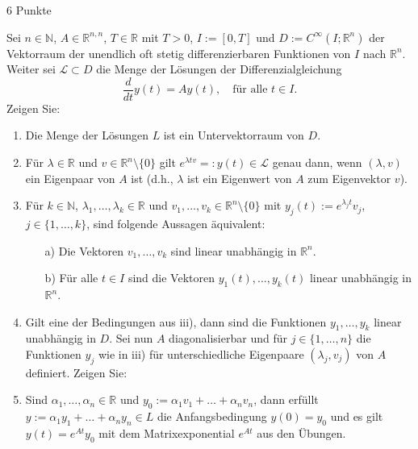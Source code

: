 \documentclass{problemset}
\begin{document}
\begin{problem}[Aufgabe 2]{6 Punkte}

Sei $n \in \mathbb{N}$, $A \in \mathbb{R}^{n,n}$, $T \in \mathbb{R}$ mit $T >
    0$, $I := [0, T]$ und $D := C^\infty(I; \mathbb{R}^n)$ der Vektorraum der
unendlich oft stetig differenzierbaren Funktionen von $I$ nach $\mathbb{R}^n$.
Weiter sei $\mathcal{L} \subset D$ die Menge der Lösungen der
Differenzialgleichung
\[ \frac{d}{dt} y(t) = Ay(t), \quad \text{für alle } t \in I. \]
Zeigen Sie:
\begin{enumerate}
    \item Die Menge der Lösungen $L$ ist ein Untervektorraum von $D$.
    \item Für $\lambda \in \mathbb{R}$ und $v \in \mathbb{R}^n \setminus \{0\}$
          gilt $e^{\lambda t v} =: y(t) \in \mathcal{L}$ genau dann, wenn
          $(\lambda, v)$ ein Eigenpaar von $A$ ist (d.h., $\lambda$ ist ein
          Eigenwert von $A$ zum Eigenvektor $v$).
    \item \label{prob:2:iii} Für $k \in \mathbb{N}$, $\lambda_1, \dots, \lambda_k \in \mathbb{R}$
          und $v_1, \dots, v_k \in \mathbb{R}^n \setminus \{0\}$ mit $y_j(t) :=
              e^{\lambda_j t} v_j$, $j \in \{1, \dots, k\}$, sind folgende Aussagen
          äquivalent:
          \begin{itemize}
              \item[a)] Die Vektoren $v_1, \dots, v_k$ sind linear unabhängig
                    in $\mathbb{R}^n$.
              \item[b)] Für alle $t \in I$ sind die Vektoren $y_1(t), \dots,
                        y_k(t)$ linear unabhängig in $\mathbb{R}^n$.
          \end{itemize}
    \item \label{prob:2:iv} Gilt eine der Bedingungen aus iii), dann sind die Funktionen $y_1,
              \dots, y_k$ linear unabhängig in $D$. Sei nun $A$ diagonalisierbar
          und für $j \in \{1, \dots, n\}$ die Funktionen $y_j$ wie in iii) für
          unterschiedliche Eigenpaare $(\lambda_j, v_j)$ von $A$ definiert.
          Zeigen Sie:
    \item Sind $\alpha_1, \dots, \alpha_n \in \mathbb{R}$ und $y_0 := \alpha_1
              v_1 + \dots + \alpha_n v_n$, dann erfüllt $y := \alpha_1 y_1 + \dots
              + \alpha_n y_n \in L$ die Anfangsbedingung $y(0) = y_0$ und es gilt
          $y(t) = e^{At} y_0$ mit dem Matrixexponential $e^{At}$ aus den
          Übungen.
\end{enumerate}


\end{problem}
\end{document}
